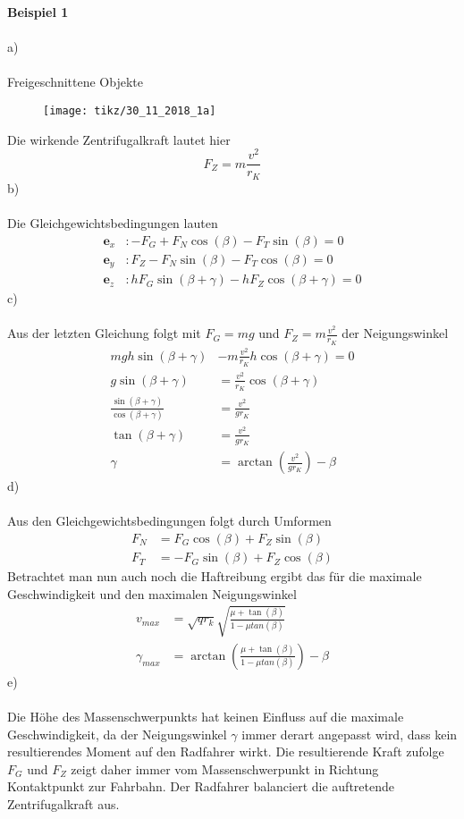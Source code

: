 \textbf{Beispiel 1}\\ \\
a)\\ \\
Freigeschnittene Objekte
\begin{figure}[h]
	\centering
	\texttt{[image: tikz/30\_11\_2018\_1a]}
\end{figure}
\newline
Die wirkende Zentrifugalkraft lautet hier
\[
	F_Z = m\frac{v^2}{r_K}
\]
b) \\ \\
Die Gleichgewichtsbedingungen lauten
\begin{align*}
	\textbf{e}_x &: -F_G + F_N\cos(\beta) - F_T\sin(\beta) = 0\\
	\textbf{e}_y &: F_Z - F_N\sin(\beta) - F_T\cos(\beta) = 0\\
	\textbf{e}_z &: hF_G\sin(\beta + \gamma) - hF_Z\cos(\beta + \gamma) = 0
\end{align*}
c) \\ \\
Aus der letzten Gleichung folgt mit $F_G = mg$ und $F_Z = m\frac{v^2}{r_K}$ der Neigungswinkel
\begin{align*}
	mgh\sin(\beta + \gamma) &- m\frac{v^2}{r_K}h\cos(\beta + \gamma) = 0 \\
		g\sin(\beta + \gamma) &= \frac{v^2}{r_K}\cos(\beta + \gamma) \\
		\frac{\sin(\beta + \gamma)}{\cos(\beta + \gamma)} &= \frac{v^2}{gr_K} \\
		\tan(\beta + \gamma) &= \frac{v^2}{gr_K} \\
		\gamma &= \arctan\left(\frac{v^2}{gr_K} \right) - \beta
\end{align*}
d)\\ \\
Aus den Gleichgewichtsbedingungen folgt durch Umformen
\begin{align*}
	F_N &= F_G\cos(\beta) + F_Z\sin(\beta) \\
	F_T &= -F_G\sin(\beta) + F_Z\cos(\beta)
\end{align*}
Betrachtet man nun auch noch die Haftreibung ergibt das für die maximale Geschwindigkeit und den maximalen Neigungswinkel
\begin{align*}
	v_{max} &= \sqrt{qr_k}\sqrt{\frac{\mu + \tan(\beta)}{1 - \mu tan(\beta)}} \\
	\gamma_{max} &= \arctan\left(\frac{\mu + \tan(\beta)}{1 - \mu tan(\beta)}\right) - \beta
\end{align*}
e)\\ \\
Die Höhe des Massenschwerpunkts hat keinen Einfluss auf die maximale Geschwindigkeit, da der Neigungswinkel $\gamma$ immer derart angepasst wird, dass kein resultierendes Moment auf den Radfahrer wirkt. Die resultierende Kraft zufolge $F_G$ und $F_Z$ zeigt daher immer vom Massenschwerpunkt in Richtung Kontaktpunkt zur Fahrbahn. Der Radfahrer balanciert die auftretende Zentrifugalkraft aus.